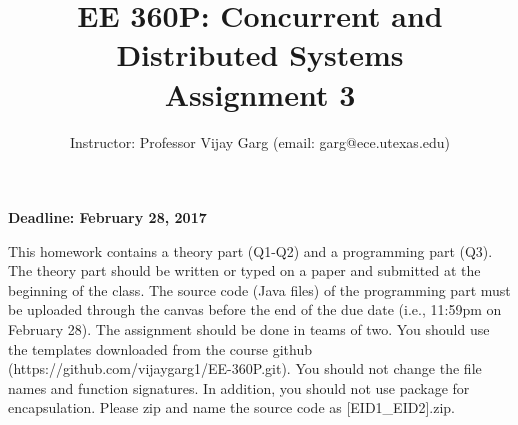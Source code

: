 \documentclass[letter, 11pt] {article}
\begin{document}
\normalsize
\title{EE 360P: Concurrent and Distributed Systems\\ Assignment 3}
\author{Instructor: Professor Vijay Garg (email: garg@ece.utexas.edu) \\
        }
\date{}
\maketitle
\begin{center}
  {\large\bf Deadline: February 28, 2017}
\end{center}


This homework contains a theory part (Q1-Q2) and a programming part (Q3).
The theory part should be written or typed on a paper and submitted at the
beginning of the class. The source code (Java files) of the programming part
must be uploaded through the canvas before the end of the due date (i.e.,
11:59pm on February 28). The assignment should be done in teams of two. You
should use the templates downloaded from the course github
(https://github.com/vijaygarg1/EE-360P.git). You should not change
the file names and function signatures. In addition, you should not use package
for encapsulation. 
Please zip and name the source code as [EID1\_EID2].zip.
\end{document}
